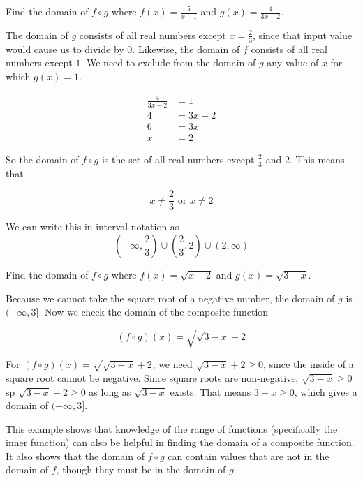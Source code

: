 \documentclass{ximera}
\begin{document}
\begin{example}
Find the domain of $f \circ g$ where $f(x)=\frac{5}{x-1}$  and $g(x)=\frac{4}{3x-2}$.

\begin{explanation}
The domain of $g$ consists of all real numbers except $x=\frac{2}{3}$, since that input value would cause us to divide by 0. Likewise, the domain of $f$ consists of all real numbers except $1$. We need to exclude from the domain of $g$ any value of $x$ for which $g(x)=1$.


\begin{align*}
\frac{4}{3x-2} &=1\\
4 &=3x-2\\
6 &=3x\\
x &=2
\end{align*}

So the domain of $f \circ g$ is the set of all real numbers except $\frac{2}{3}$ and $2$. This means that

$$
x \neq \frac{2}{3} \text{ or } x \neq 2
$$

We can write this in interval notation as
$$
\left(-\infty,\frac{2}{3}\right) \cup \left(\frac{2}{3},2\right) \cup \left(2,\infty\right)
$$

\end{explanation}
\end{example}




\begin{example}
Find the domain of $f \circ g$ where $f(x)=\sqrt{x+2}$ and $g(x)=\sqrt{3-x}$.

\begin{explanation}

Because we cannot take the square root of a negative number, the domain of $g$ is $(-\infty,3]$. Now we check the domain of the composite function

$$
(f \circ g)(x)=\sqrt{\sqrt{3-x}+2}
$$

For $(f \circ g)(x)=\sqrt{\sqrt{3-x}+2}$, we need $\sqrt{3-x}+2 \geq 0$, since the inside of a square root cannot be negative. Since square roots are non-negative, $\sqrt{3-x} \geq 0$ sp $\sqrt{3-x}+2 \geq 0$ as long as $\sqrt{3-x}$ exists. That means $3-x \geq 0$, which gives a domain of $(- \infty,3]$.

\end{explanation}

\end{example}

This example shows that knowledge of the range of functions (specifically the inner function) can also be helpful in finding the domain of a composite function. It also shows that the domain of $f \circ g$ can contain values that are not in the domain of $f$, though they must be in the domain of $g$.
\end{document}

